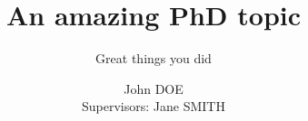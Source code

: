 
\RequirePackage{etoolbox}
\newcommand{\onlyif}[2]{\iftoggle{#1}{#2}{}}

\makeatletter
\newcommand{\iftogglehard}[1]{%
	\ifcsdef{etb@tgl@#1}
		{\csname etb@tgl@#1\endcsname\iftrue\iffalse}
		{\etb@noglobal\etb@err@notoggle{#1}\iffalse}%
}
\makeatother


\newtoggle{draft}         %
\newtoggle{showoverflow}  %
\newtoggle{allowtodo}     %
\newtoggle{showtodo}      %
\newtoggle{inlinetodo}    %
\newtoggle{printversion}  %
\newtoggle{biblatex}	  %
\newtoggle{chapter_bib}   %
\newtoggle{chap_minitoc}  %

\toggletrue{biblatex}
\toggletrue{chapter_bib}
\toggletrue{chap_minitoc}









\usepackage{lipsum}


\makeglossary
\makeindex


\title{An amazing PhD topic}
\subtitle{Great things you did}
\author{John DOE \texorpdfstring{\\[1em]}{---} Supervisors: Jane SMITH}
\date{}



